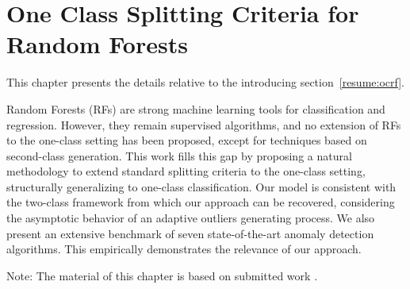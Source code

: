 \chapter{One Class Splitting Criteria for Random Forests}
\label{chap:ocrf}
\begin{chapabstract}
This chapter presents the details relative to the introducing section~\ref{resume:ocrf}.

Random Forests (RFs) are strong machine learning tools for classification and regression. However, they remain supervised algorithms, and no extension of RFs to the one-class setting has been proposed, except for techniques based on second-class generation.
This work fills this gap by proposing a natural methodology to extend standard splitting criteria to the one-class setting, structurally generalizing to one-class classification.
Our model is consistent with the two-class framework from which our approach can be recovered, considering the asymptotic behavior of an adaptive outliers generating process.
We also present an extensive benchmark of seven state-of-the-art anomaly detection algorithms. This empirically demonstrates the relevance of our approach.
\end{chapabstract}

Note: The material of this chapter is based on submitted work \citep{OCRF16}.


